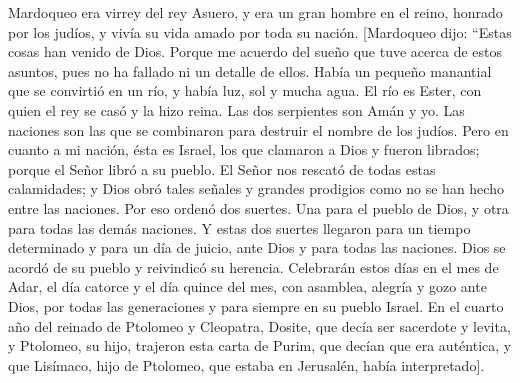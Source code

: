  Mardoqueo era virrey del rey Asuero, y era un gran hombre
en el reino, honrado por los judíos, y vivía su vida amado por toda su
nación.  {[}Mardoqueo dijo: ``Estas cosas han venido de
Dios.  Porque me acuerdo del sueño que tuve acerca de
estos asuntos, pues no ha fallado ni un detalle de ellos. 
Había un pequeño manantial que se convirtió en un río, y había luz, sol
y mucha agua. El río es Ester, con quien el rey se casó y la hizo reina.
 Las dos serpientes son Amán y yo.  Las
naciones son las que se combinaron para destruir el nombre de los
judíos.  Pero en cuanto a mi nación, ésta es Israel, los
que clamaron a Dios y fueron librados; porque el Señor libró a su
pueblo. El Señor nos rescató de todas estas calamidades; y Dios obró
tales señales y grandes prodigios como no se han hecho entre las
naciones.  Por eso ordenó dos suertes. Una para el pueblo
de Dios, y otra para todas las demás naciones.  Y estas
dos suertes llegaron para un tiempo determinado y para un día de juicio,
ante Dios y para todas las naciones.  Dios se acordó de
su pueblo y reivindicó su herencia.  Celebrarán estos
días en el mes de Adar, el día catorce y el día quince del mes, con
asamblea, alegría y gozo ante Dios, por todas las generaciones y para
siempre en su pueblo Israel.  En el cuarto año del
reinado de Ptolomeo y Cleopatra, Dosite, que decía ser sacerdote y
levita, y Ptolomeo, su hijo, trajeron esta carta de Purim, que decían
que era auténtica, y que Lisímaco, hijo de Ptolomeo, que estaba en
Jerusalén, había interpretado{]}.
